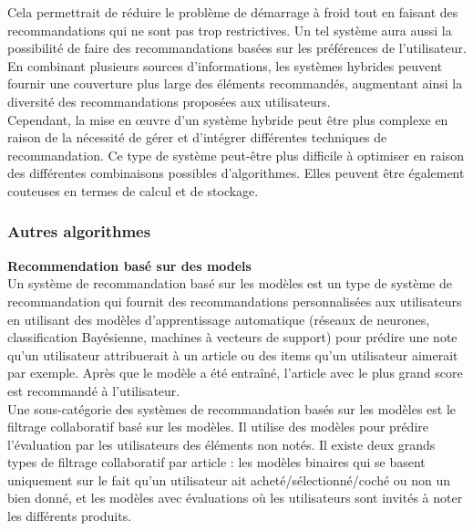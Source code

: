 \documentclass[11pt]{article}
\begin{document}
Cela permettrait de réduire le problème de démarrage à froid tout en faisant des recommandations qui ne sont pas trop restrictives. Un tel système aura aussi la possibilité de faire des recommandations basées sur les préférences de l'utilisateur.\\

En combinant plusieurs sources d'informations, les systèmes hybrides peuvent fournir une couverture plus large des éléments recommandés, augmentant ainsi la diversité des recommandations proposées aux utilisateurs.\\

Cependant, la mise en œuvre d'un système hybride peut être plus complexe en raison de la nécessité de gérer et d'intégrer différentes techniques de recommandation. Ce type de système peut-être plus difficile à optimiser en raison des différentes combinaisons possibles d'algorithmes. Elles peuvent être également couteuses en termes de calcul et de stockage.


\subsubsection{Autres algorithmes}

\textbf{Recommendation basé sur des models}\\
Un \cite{hrnjica2020model} système de recommandation basé sur les modèles est un type de système de recommandation qui fournit des recommandations personnalisées aux utilisateurs en utilisant des modèles d’apprentissage automatique (réseaux de neurones, classification Bayésienne, machines à vecteurs de support) pour prédire une note qu’un utilisateur attribuerait à un article ou des items qu'un utilisateur aimerait par exemple. Après que le modèle a été entraîné, l’article avec le plus grand score est recommandé à l’utilisateur.\\

Une sous-catégorie des systèmes de recommandation basés sur les modèles est \cite{aditya2016comparative} le filtrage collaboratif basé sur les modèles. Il utilise des modèles pour prédire l’évaluation par les utilisateurs des éléments non notés. Il existe deux grands types de filtrage collaboratif par article : les modèles binaires qui se basent uniquement sur le fait qu’un utilisateur ait acheté/sélectionné/coché ou non un bien donné, et les modèles avec évaluations où les utilisateurs sont invités à noter les différents produits.


\newpage
\end{document}
